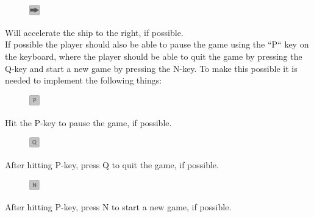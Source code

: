 \documentclass[../master.tex]{subfile}
\begin{document}
\begin{figure}
	\vspace{-6mm}
	\begin{centering}
		\includegraphics[width=0.04\textwidth]{./Pictures/Pil_right.png}
	\end{centering}
	\vspace{-6mm}
\end{figure}
Will accelerate the ship to the right, if possible.\\

If possible the player should also be able to pause the game using the ``P`` key on the keyboard, where the player should be able to quit the game by pressing the Q-key and start a new game by pressing the N-key. To make this possible it is needed to implement the following things:\\
\begin{figure}
	\vspace{-5.9mm}
	\begin{centering}
		\includegraphics[width=0.04\textwidth]{./Pictures/Pause.png}
	\end{centering}
	\vspace{-6mm}
\end{figure}
Hit the P-key to pause the game, if possible.\\

\begin{figure}
	\vspace{-5.9mm}
	\begin{centering}
		\includegraphics[width=0.04\textwidth]{./Pictures/Quit.png}
	\end{centering}
	\vspace{-6mm}
\end{figure}
After hitting P-key, press Q to quit the game, if possible.\\

\begin{figure}
	\vspace{-6mm}
	\begin{centering}
		\includegraphics[width=0.04\textwidth]{./Pictures/New_Game.png}
	\end{centering}
	\vspace{-6mm}
\end{figure}
After hitting P-key, press N to start a new game, if possible.\\
\end{document}
